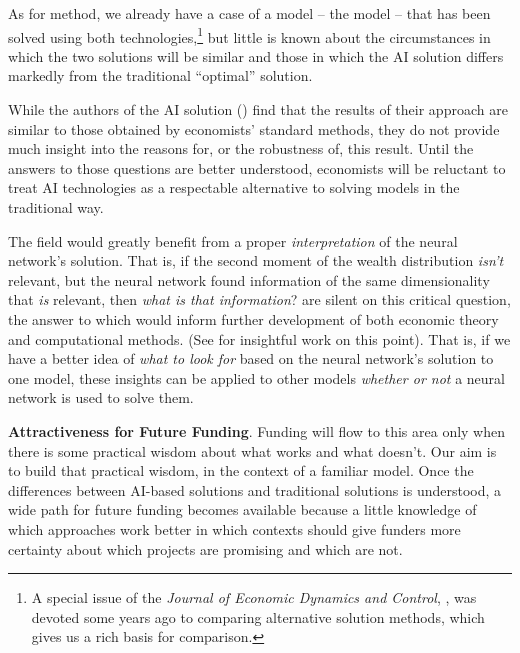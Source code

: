 \documentclass[11pt,pdftex,letterpaper]{article}
\begin{document}
      As for method, we already have a case of a model -- the \cite{KrusellSmith} model -- that has been solved using both technologies,\footnote{A special issue of the \textit{Journal of Economic Dynamics and Control}, \cite{JEDCspecial}, was devoted some years ago to comparing alternative solution methods, which gives us a rich basis for comparison.} but little is known about the circumstances in which the two solutions will be similar and those in which the AI solution differs markedly from the traditional ``optimal'' solution.

     While the authors of the AI solution (\cite{MALIAR202176}) find that the results of their approach are similar to those obtained by economists' standard methods, they do not provide much insight into the reasons for, or the robustness of, this result. Until the answers to those questions are better understood, economists will be reluctant to treat AI technologies as a respectable alternative to solving models in the traditional way.

The field would greatly benefit from a proper \textit{interpretation} of the neural network's solution. That is, if the second moment of the wealth distribution \textit{isn't} relevant, but the neural network found information of the same dimensionality that \textit{is} relevant, then \textit{what is that information}? \cite{MALIAR202176} are silent on this critical question, the answer to which would inform further development of both economic theory and computational methods.  (See \cite{Reiter2010} for insightful work on this point).  That is, if we have a better idea of \textit{what to look for} based on the neural network's solution to one model, these insights can be applied to other models \textit{whether or not} a neural network is used to solve them.

      \textbf{Attractiveness for Future Funding}. Funding will flow to this area only when there is some practical wisdom about what works and what doesn't. Our aim is to build that practical wisdom, in the context of a familiar model. Once the differences between AI-based solutions and traditional solutions is understood, a wide path for future funding becomes available because a little knowledge of which approaches work better in which contexts should give funders more certainty about which projects are promising and which are not.
      
\end{document}
